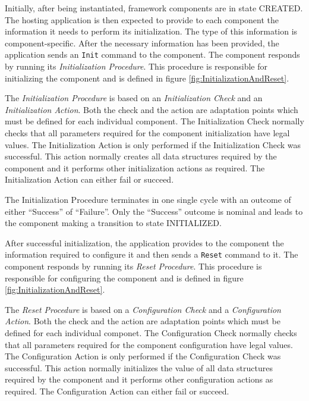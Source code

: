 \documentclass[a4paper,10pt]{article}
\begin{document}
Initially, after being instantiated, framework components are in state CREATED. 
The hosting application is then expected to provide to each component the information it needs to perform its initialization. 
The type of this information is component-specific. 
After the necessary information has been provided, the application sends an \texttt{Init} command to the component. 
The component responds by running its \textit{Initialization Procedure}. 
This procedure is responsible for initializing the component and is defined in figure  \ref{fig:InitializationAndReset}. 

The \textit{Initialization Procedure} is based on an \textit{Initialization Check} and an \textit{Initialization Action}. 
Both the check and the action are adaptation points which must be defined for each individual component. 
The Initialization Check normally checks that all parameters required for the component initialization have legal values. 
The Initialization Action is only performed if the Initialization Check was successful. 
This action normally creates all data structures required by the component and it performs other initialization actions as required. 
The Initialization Action can either fail or succeed.

The Initialization Procedure terminates in one single cycle with an outcome of either “Success” of “Failure”. 
Only the “Success” outcome is nominal and leads to the component making a transition to state INITIALIZED.

After successful initialization, the application provides to the component the information required to configure it and then sends a \texttt{Reset} command to it. 
The component responds by running its \textit{Reset Procedure}. 
This procedure is responsible for configuring the component and is defined in figure  \ref{fig:InitializationAndReset}.
 
The \textit{Reset Procedure} is based on a \textit{Configuration Check} and a \textit{Configuration Action}. 
Both the check and the action are adaptation points which must be defined for each individual componet. 
The Configuration Check normally checks that all parameters required for the component configuration have legal values. 
The Configuration Action is only performed if the Configuration Check was successful. 
This action normally initializes the value of all data structures required by the component and it performs other configuration actions as required. 
The Configuration Action can either fail or succeed.
\end{document}
